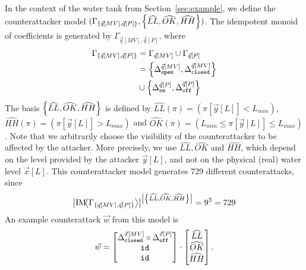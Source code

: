 {{\begin{example}
  \label{ex:counterattack}
  In the context of the water tank from Section~\ref{sec:example}, we define the counterattacker model $(\Gamma_{\left\{\vec{q}[MV],\vec{q}[P]\right\}},\left\{\widehat{LL},\widehat{OK},\widehat{HH}\right\})$. The idempotent monoid of coefficients is generated by $\Gamma_{\vec{q}[MV],\vec{q}[P]}$, where 
  \begin{align*}
    \Gamma_{\left\{\vec{q}[MV],\vec{q}[P]\right\}}&=\Gamma_{\vec{q}[MV]}\cup\Gamma_{\vec{q}[P]}\\
    &=\left\{{\Delta}^{\vec{q}[MV]}_{\texttt{open}},{\Delta}^{\vec{q}[MV]}_{\texttt{closed}}\right\}\\
    &\cup \left\{{\Delta}^{\vec{q}[P]}_{\texttt{on}},{\Delta}^{\vec{q}[P]}_{\texttt{off}}\right\}
  \end{align*}
  The basis $\left\{\widehat{LL},\widehat{OK},\widehat{HH}\right\}$ is defined by  $\widehat{LL}(\pi)=(\pi[\vec{y}[L]]<L_{min})$, $\widehat{HH}(\pi)=(\pi[\vec{y}[L]]>L_{max})$ and $\widehat{OK}(\pi)=(L_{min}\leq \pi[\vec{y}[L]]\leq L_{max})$. Note that we arbitrarily choose the visibility of the counterattacker to be affected by the attacker. More precisely, we use $\widehat{LL},\widehat{OK}$ and $\widehat{HH}$, which depend on the level provided by the attacker $\vec{y}[L]$, and not on the physical (real) water level $\vec{x}[L]$. 
  This counterattacker model generates 729 different counterattacks, 
since
\begin{align*}
  \left| \text{IM}\!{{\left<\Gamma_{\left\{\vec{q}[MV],\vec{q}[P]\right\}}\right>}}\right|^{\left|\left\{\widehat{LL},\widehat{OK},\widehat{HH}\right\}\right|}=9^3=729
\end{align*}
  An example counterattack $\vec{w}$ from this model is 
  \begin{align}
    \vec{w}=
    \begin{bmatrix}
      {\Delta}^{\vec{x}[MV]}_{\texttt{closed}} \circ {\Delta}^{\vec{x}[P]}_{\texttt{off}} \\
      {\texttt{id}} \\
      {\texttt{id}}
    \end{bmatrix}
    \cdot
    \begin{bmatrix}
      \widehat{LL} \\
      \widehat{OK}\\
      \widehat{HH}
    \end{bmatrix}.
  \end{align}
\end{example}

}}
